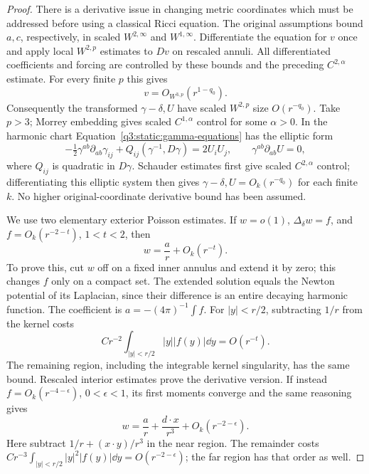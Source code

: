 \begin{proof}
There is a derivative issue in changing metric coordinates which
must be addressed before using a classical Ricci equation.
The original assumptions bound \(a,c\), respectively, in scaled
\(W^{2,\infty}\) and \(W^{1,\infty}\).
Differentiate the equation for \(v\) once and apply local
\(W^{2,p}\) estimates to \(Dv\) on rescaled annuli.
All differentiated coefficients and forcing are controlled by
these bounds and the preceding \(C^{2,\alpha}\) estimate.
For every finite \(p\) this gives
\[
v=O_{W^{3,p}}(r^{1-q_0}).
\]
Consequently the transformed \(\gamma-\delta,U\) have scaled
\(W^{2,p}\) size \(O(r^{-q_0})\).
Take \(p>3\); Morrey embedding gives scaled \(C^{1,\alpha}\)
control for some \(\alpha>0\).
In the harmonic chart Equation~\eqref{q3:static:gamma-equations}
has the elliptic form
\[
-\tfrac12\gamma^{ab}\partial_{ab}\gamma_{ij}
 +Q_{ij}(\gamma^{-1},D\gamma)=2U_iU_j,\qquad
\gamma^{ab}\partial_{ab}U=0,
\]
where \(Q_{ij}\) is quadratic in \(D\gamma\).
Schauder estimates first give scaled \(C^{2,\alpha}\) control;
differentiating this elliptic system then gives
\(\gamma-\delta,U=O_k(r^{-q_0})\) for each finite \(k\).
No higher original-coordinate derivative bound has been assumed.

We use two elementary exterior Poisson estimates.
If \(w=o(1)\), \(\Delta_\delta w=f\), and
\(f=O_k(r^{-2-t})\), \(1<t<2\), then
\begin{equation}
\label{q3:static:poisson-monopole}
w=\frac ar+O_k(r^{-t}).
\end{equation}
To prove this, cut \(w\) off on a fixed inner annulus and extend it
by zero; this changes \(f\) only on a compact set.
The extended solution equals the Newton potential of its Laplacian,
since their difference is an entire decaying harmonic function.
The coefficient is \(a=-(4\pi)^{-1}\int f\).
For \(|y|<r/2\), subtracting \(1/r\) from the kernel costs
\[
Cr^{-2}\int_{|y|<r/2}|y||f(y)|\dd y=O(r^{-t}).
\]
The remaining region, including the integrable kernel singularity,
has the same bound. Rescaled interior estimates prove the derivative
version.
If instead \(f=O_k(r^{-4-\epsilon})\), \(0<\epsilon<1\), its first
moments converge and the same reasoning gives
\begin{equation}
\label{q3:static:poisson-dipole}
w=\frac ar+\frac{d\cdot x}{r^3}+O_k(r^{-2-\epsilon}).
\end{equation}
Here subtract \(1/r+(x\cdot y)/r^3\) in the near region.
The remainder costs
\(Cr^{-3}\int_{|y|<r/2}|y|^2|f(y)|\dd y
 =O(r^{-2-\epsilon})\); the far region has that order as well.


\end{proof}
